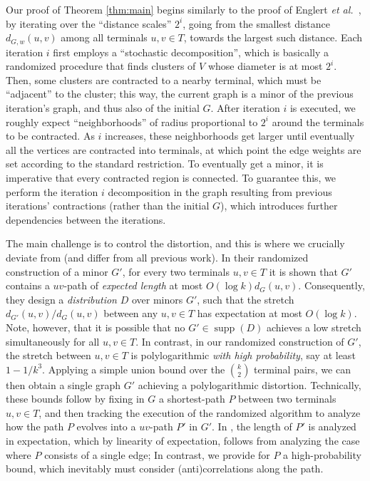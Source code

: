 \documentclass[twoside,leqno,twocolumn]{article}
\DeclareMathOperator{\supp}{supp}
\newcommand{\etal}{{\em et al.\ }\xspace}
\begin{document}
Our proof of Theorem \ref{thm:main} begins similarly to the proof of Englert \etal \cite{EGKRTT10}, 
by iterating over the ``distance scales'' $2^i$, 
going from the smallest distance $d_{G,w}(u,v)$ among all terminals $u,v \in T$,
towards the largest such distance.
Each iteration $i$ first employs a ``stochastic decomposition'',
which is basically a randomized procedure that finds 
clusters of $V$ whose diameter is at most $2^i$.
Then, some clusters are contracted to a nearby terminal,
which must be ``adjacent'' to the cluster;
this way, the current graph is a minor of the previous iteration's graph, 
and thus also of the initial $G$.
After iteration $i$ is executed, 
we roughly expect ``neighborhoods'' of radius proportional to $2^i$ 
around the terminals to be contracted.
As $i$ increases, these neighborhoods get larger
until eventually all the vertices are contracted into terminals,
at which point the edge weights are set according to the standard restriction.
To eventually get a minor, 
it is imperative that every contracted region is connected.
To guarantee this, we perform the iteration $i$ decomposition in the graph 
resulting from previous iterations' contractions (rather than the initial $G$),
which introduces further dependencies between the iterations.

The main challenge is to control the distortion,
and this is where we crucially deviate from \cite{EGKRTT10}
(and differ from all previous work).
In their randomized construction of a minor $G'$, 
for every two terminals $u,v\in T$ it is shown that $G'$ contains
a $uv$-path of \emph{expected length} at most $O(\log k) d_G(u,v)$.
Consequently, they design a \emph{distribution} $D$ over minors $G'$,
such that the stretch $d_{G'}(u,v)/d_G(u,v)$ between any $u,v\in T$
has expectation at most $O(\log k)$. Note, however, that it is possible that no $G'\in\supp(D)$ achieves a low stretch 
simultaneously for all $u,v\in T$.
In contrast, in our randomized construction of $G'$,
the stretch between $u,v\in T$ is polylogarithmic
\emph{with high probability}, say at least $1-1/k^3$.
Applying a simple union bound over the $\binom{k}{2}$ terminal pairs,
we can then obtain a single graph $G'$ achieving a polylogarithmic distortion.
Technically, these bounds follow by fixing in $G$ 
a shortest-path $P$ between two terminals $u,v\in T$,
and then tracking the execution of the randomized algorithm
to analyze how the path $P$ evolves into a $uv$-path $P'$ in $G'$.
In \cite{EGKRTT10}, the length of $P'$ is analyzed in expectation,
which by linearity of expectation, 
follows from analyzing the case where $P$ consists of a single edge;
In contrast, we provide for $P$ a high-probability bound,
which inevitably must consider (anti)correlations along the path.
\end{document}
